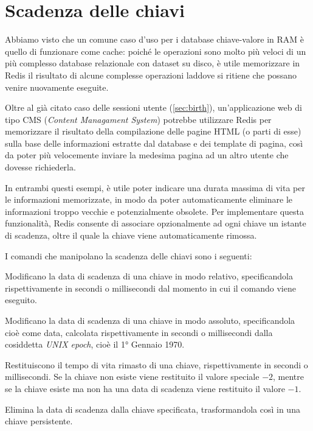 \section{Scadenza delle chiavi}

Abbiamo visto che un comune caso d'uso per i database chiave-valore in RAM è quello di funzionare
come cache: poiché le operazioni sono molto più veloci di un più complesso database relazionale con
dataset su disco, è utile memorizzare in Redis il risultato di alcune complesse operazioni laddove
si ritiene che possano venire nuovamente eseguite. 

Oltre al già citato caso delle sessioni utente (\autoref{sec:birth}), un'applicazione web di tipo CMS
(\emph{Content Managament System}) potrebbe utilizzare Redis per memorizzare il risultato della
compilazione delle pagine HTML (o parti di esse) sulla base delle informazioni estratte dal database
e dei template di pagina, così da poter più velocemente inviare la medesima pagina ad un altro
utente che dovesse richiederla.

In entrambi questi esempi, è utile poter indicare una durata massima di vita per le informazioni
memorizzate, in modo da poter automaticamente eliminare le informazioni troppo vecchie e
potenzialmente obsolete. Per implementare questa funzionalità, Redis consente di associare
opzionalmente ad ogni chiave un istante di scadenza, oltre il quale la chiave viene automaticamente
rimossa.

I comandi che manipolano la scadenza delle chiavi sono i seguenti:

\begin{description}[style=nextline,font={\bfseries\ttfamily}]
	\item[EXPIRE key sec / PEXPIRE key msec] Modificano la data di scadenza di una chiave in modo
		relativo, specificandola rispettivamente in secondi o millisecondi dal momento in cui il
		comando viene eseguito.
	\item[EXPIREAT key timestamp / PEXPIREAT key mstimestamp] Modificano la data di scadenza di una
		chiave in modo assoluto, specificandola cioè come data, calcolata rispettivamente in secondi
		o millisecondi dalla cosiddetta \emph{UNIX epoch}, cioè il 1° Gennaio 1970.
	\item[TTL key / PTTL key] Restituiscono il tempo di vita rimasto di una chiave, rispettivamente
		in secondi o millisecondi. Se la chiave non esiste viene restituito il valore speciale $-2$,
		mentre se la chiave esiste ma non ha una data di scadenza viene restituito il valore $-1$.
	\item[PERSIST key] Elimina la data di scadenza dalla chiave specificata, trasformandola così in
		una chiave persistente.
\end{description}

